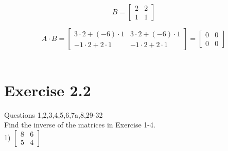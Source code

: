 \documentclass[a4paper]{article}
\begin{document}
\[B = 
\begin{bmatrix}
2&2\\
1&1
\end{bmatrix}
\]

\[A \cdot B =
\begin{bmatrix}
3\cdot2+(-6)\cdot1&3\cdot2+(-6)\cdot1\\
-1\cdot2+2\cdot1&-1\cdot2+2\cdot1
\end{bmatrix} =
\begin{bmatrix}
0&0\\
0&0
\end{bmatrix}
\]\\

\section{Exercise 2.2}
Questions 1,2,3,4,5,6,7a,8,29-32\\

Find the inverse of the matrices in Exercise 1-4.\\

1) $\begin{bmatrix}
8&6\\
5&4
\end{bmatrix}$
\end{document}

